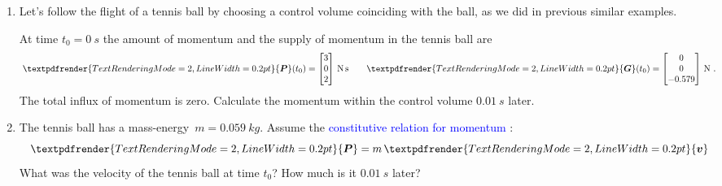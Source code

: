 \documentclass[a4paper,12pt,%
onecolumn,oneside,%
british%
]{memoir}
\renewcommand*{\bm}[1]{\textpdfrender{TextRenderingMode=2,LineWidth=0.2pt}{\boldsymbol{#1}}}
\renewcommand*{\|}[1][]{\nonscript\:#1\vert\nonscript\:\mathopen{}}
\newcommand*{\sect}{\S}%
\renewcommand*{\autoref}[3][\sect\,\ref]{\textcolor{blue}{#3}
\raisebox{0.6ex}{\color{blue}\miniscule%
\faIcon{angle-right}%
\;#1{#2}\;p.\,\pageref{#2}}}
\newcommand*{\masse}{mass-energy}
\newcommand*{\yv}{\bm{v}}
\newcommand*{\yti}{t_{0}}
\newcommand*{\ym}{m}%
\newcommand*{\yP}{\bm{P}}
\newcommand*{\yG}{\bm{G}}
\begin{document}
\begin{exercise}[label={ex:tennisball}]
  \begin{enumerate}[exerc]
  \item Let's follow the flight of a tennis ball by choosing a control volume coinciding with the ball, as we did in previous similar examples.

    \smallskip

    At time $\yti=\qty{0}{s}$ the amount of momentum and the supply of momentum in the tennis ball are
    \begin{equation*}
      \yP(\yti) =
      \begin{bmatrix}
        3\\0\\2
      \end{bmatrix}\,\unit{N\,s}
      \qquad
      \yG(\yti) =
      \begin{bmatrix}
        0\\0\\-0.579
      \end{bmatrix}\,\unit{N} \ .
    \end{equation*}
    The total influx of momentum is zero. Calculate the momentum within the control volume $\qty{0.01}{s}$ later.

  \item The tennis ball has a \masse\ $\ym = \qty{0.059}{kg}$. Assume the \autoref{item:momentum_mass_velocity}{constitutive relation for momentum}:
    \begin{equation*}
      \yP = \ym\,\yv
    \end{equation*}
    What was the velocity of the tennis ball at time $\yti$? How much is it $\qty{0.01}{s}$ later?
  \end{enumerate}
\end{exercise}
%
%
\end{document}
